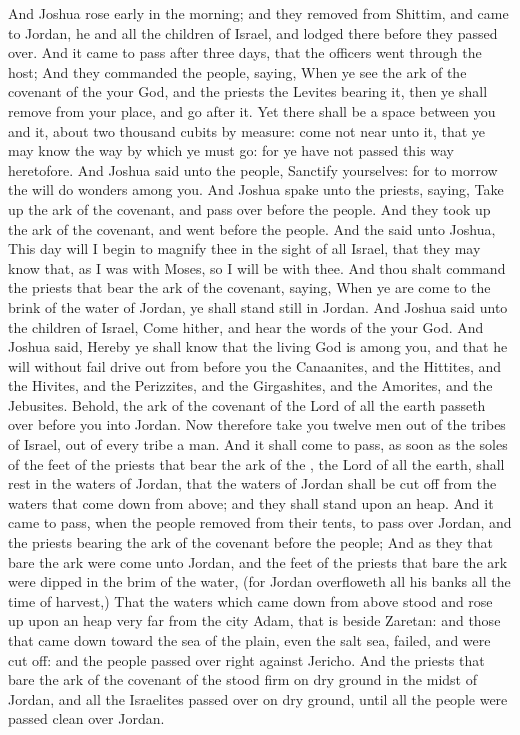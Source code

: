 \begin{biblechapter} %
 And Joshua rose early in the morning; and they removed from Shittim, and came to Jordan, he and all the children of Israel, and lodged there before they passed over.
\verse And it came to pass after three days, that the officers went through the host;
\verse And they commanded the people, saying, When ye see the ark of the covenant of the \LORD your God, and the priests the Levites bearing it, then ye shall remove from your place, and go after it.
\verse Yet there shall be a space between you and it, about two thousand cubits by measure: come not near unto it, that ye may know the way by which ye must go: for ye have not passed this way heretofore.
\verse And Joshua said unto the people, Sanctify yourselves: for to morrow the \LORD will do wonders among you.
\verse And Joshua spake unto the priests, saying, Take up the ark of the covenant, and pass over before the people. And they took up the ark of the covenant, and went before the people.
\verse And the \LORD said unto Joshua, This day will I begin to magnify thee in the sight of all Israel, that they may know that, as I was with Moses, so I will be with thee.
\verse And thou shalt command the priests that bear the ark of the covenant, saying, When ye are come to the brink of the water of Jordan, ye shall stand still in Jordan.
\verse And Joshua said unto the children of Israel, Come hither, and hear the words of the \LORD your God.
\verse And Joshua said, Hereby ye shall know that the living God is among you, and that he will without fail drive out from before you the Canaanites, and the Hittites, and the Hivites, and the Perizzites, and the Girgashites, and the Amorites, and the Jebusites.
\verse Behold, the ark of the covenant of the Lord of all the earth passeth over before you into Jordan.
\verse Now therefore take you twelve men out of the tribes of Israel, out of every tribe a man.
\verse And it shall come to pass, as soon as the soles of the feet of the priests that bear the ark of the \LORD, the Lord of all the earth, shall rest in the waters of Jordan, that the waters of Jordan shall be cut off from the waters that come down from above; and they shall stand upon an heap.
\verse And it came to pass, when the people removed from their tents, to pass over Jordan, and the priests bearing the ark of the covenant before the people;
\verse And as they that bare the ark were come unto Jordan, and the feet of the priests that bare the ark were dipped in the brim of the water, (for Jordan overfloweth all his banks all the time of harvest,)
\verse That the waters which came down from above stood and rose up upon an heap very far from the city Adam, that is beside Zaretan: and those that came down toward the sea of the plain, even the salt sea, failed, and were cut off: and the people passed over right against Jericho.
\verse And the priests that bare the ark of the covenant of the \LORD stood firm on dry ground in the midst of Jordan, and all the Israelites passed over on dry ground, until all the people were passed clean over Jordan.
\end{biblechapter}

